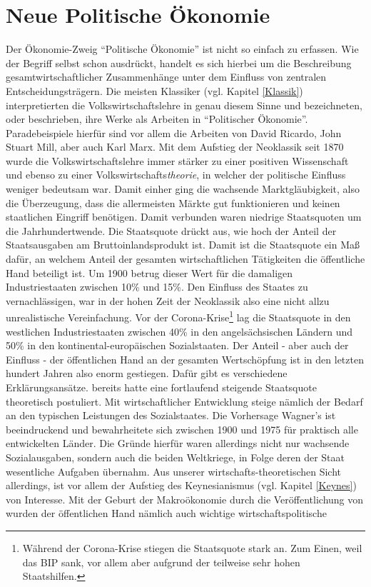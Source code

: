 %
%
%

\chapter{Neue Politische Ökonomie}
\label{Neue_Politik}

Der Ökonomie-Zweig "`Politische Ökonomie"' ist nicht so einfach zu erfassen. Wie der Begriff selbst schon ausdrückt, handelt es sich hierbei um die Beschreibung gesamtwirtschaftlicher Zusammenhänge unter dem Einfluss von zentralen Entscheidungsträgern. Die meisten Klassiker (vgl. Kapitel \ref{Klassik}) interpretierten die Volkswirtschaftslehre in genau diesem Sinne und bezeichneten, oder beschrieben, ihre Werke als Arbeiten in "`Politischer Ökonomie"'. Paradebeispiele hierfür sind vor allem die Arbeiten von David Ricardo, John Stuart Mill, aber auch Karl Marx. Mit dem Aufstieg der Neoklassik seit 1870 wurde die Volkswirtschaftslehre immer stärker zu einer positiven Wissenschaft und ebenso zu einer Volkswirtschafts\textit{theorie}, in welcher der politische Einfluss weniger bedeutsam war. Damit einher ging die wachsende Marktgläubigkeit, also die Überzeugung, dass die allermeisten Märkte gut funktionieren und keinen staatlichen Eingriff benötigen. Damit verbunden waren niedrige Staatsquoten um die Jahrhundertwende. Die Staatsquote drückt aus, wie hoch der Anteil der Staatsausgaben am Bruttoinlandsprodukt ist. Damit ist die Staatsquote ein Maß dafür, an welchem Anteil der gesamten wirtschaftlichen Tätigkeiten die öffentliche Hand beteiligt ist. Um 1900 betrug dieser Wert für die damaligen Industriestaaten zwischen 10\% und 15\%. Den Einfluss des Staates zu vernachlässigen, war in der hohen Zeit der Neoklassik also eine nicht allzu unrealistische Vereinfachung. Vor der Corona-Krise\footnote{Während der Corona-Krise stiegen die Staatsquote stark an. Zum Einen, weil das BIP sank, vor allem aber aufgrund der teilweise sehr hohen Staatshilfen.} lag die Staatsquote in den westlichen Industriestaaten zwischen 40\% in den angelsächsischen Ländern und 50\% in den kontinental-europäischen Sozialstaaten. Der Anteil - aber auch der Einfluss - der öffentlichen Hand an der gesamten Wertschöpfung ist in den letzten hundert Jahren also enorm gestiegen. Dafür gibt es verschiedene Erklärungsansätze. \textcite{Wagner1892} bereits hatte eine fortlaufend steigende Staatsquote theoretisch postuliert. Mit wirtschaftlicher Entwicklung steige nämlich der Bedarf an den typischen Leistungen des Sozialstaates. Die Vorhersage Wagner's ist beeindruckend und bewahrheitete sich zwischen 1900 und 1975 für praktisch alle entwickelten Länder. Die Gründe hierfür waren allerdings nicht nur wachsende Sozialausgaben, sondern auch die beiden Weltkriege, in Folge deren der Staat wesentliche Aufgaben übernahm. Aus unserer wirtschafts-theoretischen Sicht allerdings, ist vor allem der Aufstieg des Keynesianismus (vgl. Kapitel \ref{Keynes}) von Interesse. Mit der Geburt der Makroökonomie durch die Veröffentlichung von \textcite{Keynes1936}  wurden der öffentlichen Hand nämlich auch wichtige wirtschaftspolitische 